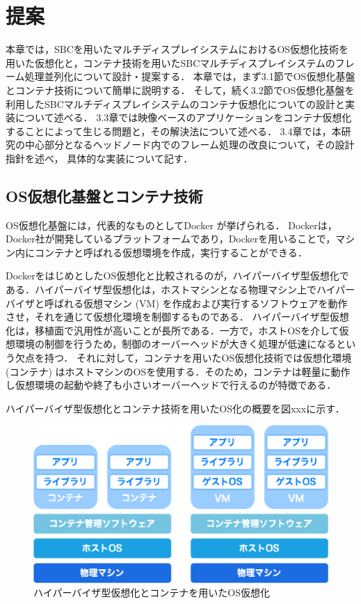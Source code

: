 \chapter{提案}
本章では，SBCを用いたマルチディスプレイシステムにおけるOS仮想化技術を用いた仮想化と，コンテナ技術を用いたSBCマルチディスプレイシステムのフレーム処理並列化について設計・提案する．
本章では，まず3.1節でOS仮想化基盤とコンテナ技術について簡単に説明する．
そして，続く3.2節でOS仮想化基盤を利用したSBCマルチディスプレイシステムのコンテナ仮想化についての設計と実装について述べる．
3.3章では映像ベースのアプリケーションをコンテナ仮想化することによって生じる問題と，その解決法について述べる．
3.4章では，本研究の中心部分となるヘッドノード内でのフレーム処理の改良について，その設計指針を述べ，
具体的な実装について記す．

\section{OS仮想化基盤とコンテナ技術}
OS仮想化基盤には，代表的なものとしてDocker \cite{docker}が挙げられる．
Dockerは，Docker社が開発しているプラットフォームであり，Dockerを用いることで，マシン内にコンテナと呼ばれる仮想環境を作成，実行することができる．

DockerをはじめとしたOS仮想化と比較されるのが，ハイパーバイザ型仮想化である．ハイパーバイザ型仮想化は，ホストマシンとなる物理マシン上でハイパーバイザと呼ばれる仮想マシン (VM) を作成および実行するソフトウェアを動作させ，それを通じて仮想化環境を制御するものである．
ハイパーバイザ型仮想化は，移植面で汎用性が高いことが長所である．一方で，ホストOSを介して仮想環境の制御を行うため，制御のオーバーヘッドが大きく処理が低速になるという欠点を持つ．
それに対して，コンテナを用いたOS仮想化技術では仮想化環境 (コンテナ) はホストマシンのOSを使用する．そのため，コンテナは軽量に動作し仮想環境の起動や終了も小さいオーバーヘッドで行えるのが特徴である．

ハイパーバイザ型仮想化とコンテナ技術を用いたOS化の概要を図xxxに示す．

\begin{figure}[H]
    \hspace*{\fill}
    \includegraphics[width=\linewidth]{./fig/chap3/docker.eps}
    \hspace*{\fill}
    \caption{ハイパーバイザ型仮想化とコンテナを用いたOS仮想化}
\end{figure}

